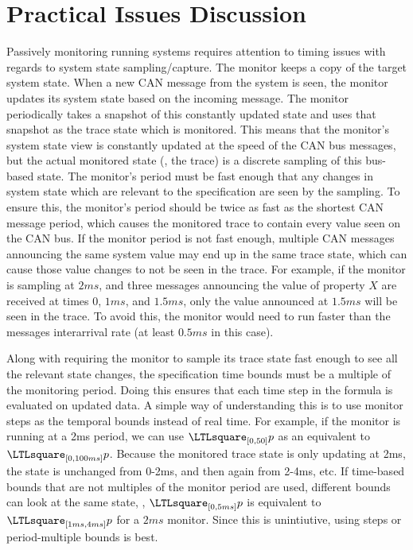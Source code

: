 
\section{Practical Issues Discussion}

Passively monitoring running systems requires attention to timing issues with regards to system state sampling/capture.
%
The monitor keeps a copy of the target system state. When a new CAN message from the system is seen, the monitor updates its system state based on the incoming message. The monitor periodically takes a snapshot of this constantly updated state and uses that snapshot as the trace state which is monitored.
%
This means that the monitor's system state view is constantly updated at the speed of the CAN bus messages, but the actual monitored state (\ie, the trace) is a discrete sampling of this bus-based state. 
The monitor's period must be fast enough that any changes in system state which are relevant to the specification are seen by the sampling. 
To ensure this, the monitor's period should be twice as fast as the shortest CAN message period, which causes the monitored trace to contain every value seen on the CAN bus. 
If the monitor period is not fast enough, multiple CAN messages announcing the same system value may end up in the same trace state, which can cause those value changes to not be seen in the trace. 
For example, if the monitor is sampling at $2ms$, and three messages announcing the value of property $X$ are received at times $0$, $1ms$, and $1.5ms$, only the value announced at $1.5ms$ will be seen in the trace. To avoid this, the monitor would need to run faster than the messages interarrival rate (at least $0.5ms$ in this case).

Along with requiring the monitor to sample its trace state fast enough to see all the relevant state changes, the specification time bounds must be a multiple of the monitoring period. 
Doing this ensures that each time step in the formula is evaluated on updated data. 
A simple way of understanding this is to use monitor steps as the temporal bounds instead of real time. 
For example, if the monitor is running at a 2ms period, we can use $\henceforth_{[0,50]} p$ as an equivalent to $\henceforth_{[0,100ms]} p$.
Because the monitored trace state is only updating at 2ms, the state is unchanged from 0-2ms, and then again from 2-4ms, etc. 
If time-based bounds that are not multiples of the monitor period are used, different bounds can look at the same state, \eg, $\henceforth_{[0,5ms]} p$ is equivalent to $\henceforth_{[1ms,4ms]} p$ for a $2ms$ monitor. Since this is unintiutive, using steps or period-multiple bounds is best.


